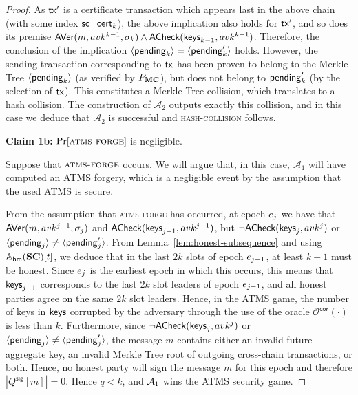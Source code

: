 \begin{proof}
  As $\mathsf{tx}'$ is a certificate transaction which appears last in the above chain
  (with some index $\mathsf{sc\_cert}_k$), the above implication also holds for $\mathsf{tx}'$,
  and so does its premise
  $
    \textsf{AVer}(m, avk^{k-1}, \sigma_k)
    \land
    \textsf{ACheck}(\textsf{keys}_{k-1}, avk^{k-1})
  $.
  Therefore, the conclusion of the implication
  $\langle\mathsf{pending}_k\rangle = \langle\mathsf{pending}'_k\rangle$ holds.
  However, the sending transaction corresponding to $\mathsf{tx}$ has been proven to belong to the Merkle Tree
  $\langle\mathsf{pending}_k\rangle$ (as verified by $P_{\mathbf{MC}}$), but does not belong
  to $\mathsf{pending}'_k$ (by the selection of $\mathsf{tx}$). This constitutes a Merkle Tree collision,
  which translates to a hash collision. The construction of $\mathcal{A}_2$
  outputs exactly this collision, and in this case we deduce that
  $\mathcal{A}_2$ is successful and \textsc{hash-collision} follows.

  \textbf{Claim 1b:} $\Pr[\textsc{atms-forge}]$  is negligible.

  \noindent
  Suppose that $\textsc{atms-forge}$ occurs. We will argue that, in this case,
  $\mathcal{A}_1$ will have computed an ATMS forgery, which is a negligible
  event by the assumption that the used ATMS is secure.

  From the assumption that
  \textsc{atms-forge} has occurred, at epoch $e_j$ we have that
  $\textsf{AVer}(m, avk^{j-1}, \sigma_j)$ and $\textsf{ACheck}(\textsf{keys}_{j-1},
  avk^{j-1})$, but $\lnot \textsf{ACheck}(\textsf{keys}_j, avk^j)$ or
  $\langle\mathsf{pending}_j\rangle \neq \langle\mathsf{pending}'_j\rangle$. From
  Lemma~\ref{lem:honest-subsequence} and using $\mathbb{A}_{\mathsf{hm}}(\mathbf{SC})[t]$, we deduce that in the last $2k$ slots of epoch
  $e_{j-1}$, at least $k+1$ must be honest. Since $e_j$ is the
  earliest epoch in which this occurs, this means that $\textsf{keys}_{j-1}$
  corresponds to the last $2k$ slot leaders of epoch $e_{j-1}$, and all
  honest parties agree on the same $2k$ slot leaders. Hence, in the ATMS game,
  the number of keys in $\textsf{keys}$ corrupted by the adversary through the use
  of the oracle $\mathcal{O}^\textsf{cor}(\cdot)$ is less than $k$. Furthermore,
  since $\lnot \textsf{ACheck}(\textsf{keys}_j, avk^j)$ or $\langle\mathsf{pending}_j\rangle \neq \langle\mathsf{pending}'_j\rangle$,
  the message $m$ contains either an invalid future aggregate key,
  an invalid Merkle Tree root of outgoing cross-chain transactions, or both.
  Hence, no honest party will sign the message $m$ for this epoch and therefore $|Q^\textsf{sig}[m]| = 0$. Hence
  $q < k$, %
  and $\mathcal{A}_1$ wins the ATMS security game.


\end{proof}
